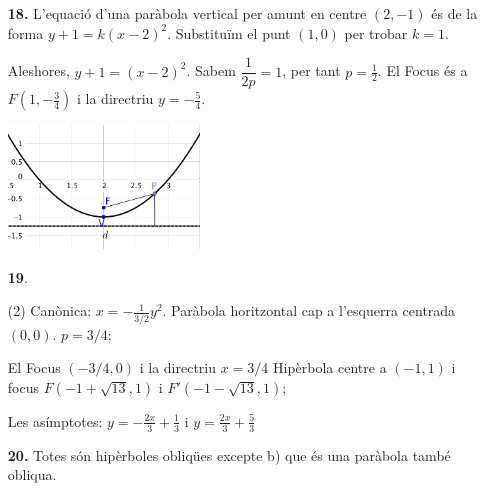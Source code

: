 \documentclass[a4paper, pdf, twoside]{book}
\begin{document}
\begin{multicols}{2}
\begin{enumerate}
\vspace{0.25cm}
\item[\fontfamily{phv}\selectfont\color{blue}\textbf{18. }] 
L'equació d'una paràbola vertical per amunt en centre $(2,-1)$ és de la forma $y+1=k(x-2)^2$. Substituïm el punt $(1,0)$ per trobar $k=1$.\par Aleshores, $y+1=(x-2)^2$. Sabem $\dfrac {1}{2p}=1$, per tant $p=\frac {1}{2}$. El Focus és a $F(1,-\frac {3}{4})$ i la directriu $y=-\frac {5}{4}$.\par \includegraphics [width=0.4\textwidth ]{img-sol/t10-16}
\vspace{0.25cm}



 \item[\fontfamily{phv}\selectfont\color{blue}\textbf{19}. ] 
 \begin{tasks}[column-sep=1em, item-indent=1.3333em](2)
	 \task* Canònica: $x=-\frac {1}{3/2}y^2$. Paràbola horitzontal cap a l'esquerra centrada $(0,0)$. $p=3/4$;\par El Focus $(-3/4,0)$ i la directriu $x=3/4$
	 \task* Hipèrbola centre a $(-1,1)$ i focus $F(-1+\sqrt {13},1)$ i $F'(-1-\sqrt {13},1)$;\par Les asímptotes: $y=-\frac {2x}{3}+\frac {1}{3}$ i $y=\frac {2x}{3}+\frac {5}{3}$\par {} 
\end{tasks}
\vspace{0.25cm}
\item[\fontfamily{phv}\selectfont\color{blue}\textbf{20. }] 
 Totes són hipèrboles obliqües excepte b) que és una paràbola també obliqua. \par {}
\vspace{0.25cm}




\end{enumerate}
\end{multicols}
\end{document}
